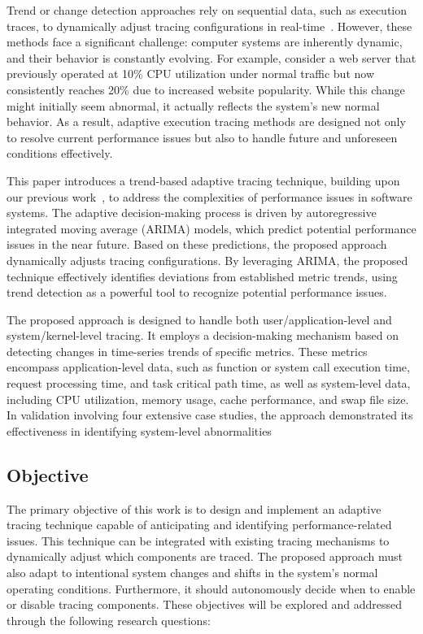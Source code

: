 \documentclass[pdflatex,sn-nature]{sn-jnl}%
\theoremstyle{thmstyleone}%
\theoremstyle{thmstyletwo}%
\theoremstyle{thmstylethree}%
\begin{document}
Trend or change detection approaches rely on sequential data, such as execution traces, to dynamically adjust tracing configurations in real-time~\cite{cantrill2004dynamic,ates2019automated}. However, these methods face a significant challenge: computer systems are inherently dynamic, and their behavior is constantly evolving. For example, consider a web server that previously operated at 10\% CPU utilization under normal traffic but now consistently reaches 20\% due to increased website popularity. While this change might initially seem abnormal, it actually reflects the system’s new normal behavior. As a result, adaptive execution tracing methods are designed not only to resolve current performance issues but also to handle future and unforeseen conditions effectively.

This paper introduces a trend-based adaptive tracing technique, building upon our previous work~\cite{10197790}, to address the complexities of performance issues in software systems. The adaptive decision-making process is driven by autoregressive integrated moving average (ARIMA) models, which predict potential performance issues in the near future. Based on these predictions, the proposed approach dynamically adjusts tracing configurations. By leveraging ARIMA, the proposed technique effectively identifies deviations from established metric trends, using trend detection as a powerful tool to recognize potential performance issues. 

The proposed approach is designed to handle both user/application-level and system/kernel-level tracing. It employs a decision-making mechanism based on detecting changes in time-series trends of specific metrics. These metrics encompass application-level data, such as function or system call execution time, request processing time, and task critical path time, as well as system-level data, including CPU utilization, memory usage, cache performance, and swap file size. In validation involving four extensive case studies, the approach demonstrated its effectiveness in identifying system-level abnormalities

\subsection{Objective}

The primary objective of this work is to design and implement an adaptive tracing technique capable of anticipating and identifying performance-related issues. This technique can be integrated with existing tracing mechanisms to dynamically adjust which components are traced. The proposed approach must also adapt to intentional system changes and shifts in the system's normal operating conditions. Furthermore, it should autonomously decide when to enable or disable tracing components. These objectives will be explored and addressed through the following research questions:
\end{document}
